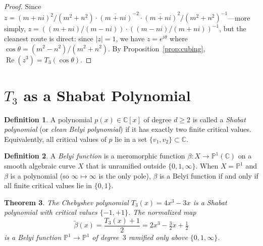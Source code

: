 \documentclass[12pt]{amsart}
\newtheorem{theorem}{Theorem}[section]
\theoremstyle{definition}
\newtheorem{definition}[theorem]{Definition}
\theoremstyle{remark}
\newcommand{\CC}{\mathbb{C}}
\newcommand{\PP}{\mathbb{P}}
\DeclareMathOperator{\re}{Re}
\begin{document}
\begin{proof}
Since $z = (m+ni)^2/(m^2+n^2) \cdot \overline{(m+ni)}^{-2}\cdot
\overline{(m+ni)}^2/(m^2+n^2)^{-1}$---more simply, $z = ((m+ni)/(m-ni))
\cdot ((m-ni)/(m+ni))^{-1}$, but the cleanest route is direct: since
$|z|=1$, we have $z = e^{i\theta}$ where $\cos\theta=(m^2-n^2)/(m^2+n^2)$.
By Proposition~\ref{prop:cubing}, $\re(z^3) = T_3(\cos\theta)$.
\end{proof}


\section{$T_3$ as a Shabat Polynomial}\label{sec:shabat}

\begin{definition}\label{def:shabat}
A polynomial $p(x)\in\CC[x]$ of degree $d\ge 2$ is called a
\emph{Shabat polynomial} (or \emph{clean Belyi polynomial}) if it
has exactly two finite critical values.  Equivalently, all critical
values of $p$ lie in a set $\{v_1, v_2\} \subset \CC$.
\end{definition}

\begin{definition}\label{def:belyi}
A \emph{Belyi function} is a meromorphic function
$\beta\colon X \to \PP^1(\CC)$ on a smooth algebraic curve $X$ that
is unramified outside $\{0,1,\infty\}$.  When $X=\PP^1$ and $\beta$
is a polynomial (so $\infty\mapsto\infty$ is the only pole), $\beta$
is a Belyi function if and only if all finite critical values lie in
$\{0,1\}$.
\end{definition}

\begin{theorem}\label{thm:shabat}
The Chebyshev polynomial $T_3(x) = 4x^3 - 3x$ is a Shabat polynomial
with critical values $\{-1, +1\}$.  The normalized map
\begin{equation}\label{eq:belyi-normalize}
  \tilde{\beta}(x) = \frac{T_3(x)+1}{2} = 2x^3 - \tfrac{3}{2}x + \tfrac{1}{2}
\end{equation}
is a Belyi function $\PP^1\to\PP^1$ of degree~$3$ ramified only above
$\{0,1,\infty\}$.
\end{theorem}
\end{document}
